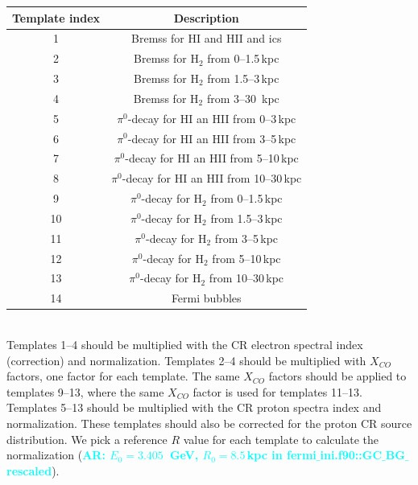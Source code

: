 \documentclass{article}
\newcommand{\ar}[1]{\textcolor{cyan}{{\bf AR: #1}}}
\begin{document}
   \begin{tabular}[h]{c|c}
      Template index & Description \\
      \hline
      1 & Bremss for HI and HII and ics \\
      2 & Bremss for H$_2$ from 0--1.5\,kpc \\
      3 & Bremss for H$_2$ from 1.5--3\,kpc \\
      4 & Bremss for H$_2$ from 3--30 \,kpc \\
      5 & $\pi^0$-decay for HI an HII from 0--3\,kpc \\
      6 & $\pi^0$-decay for HI an HII from 3--5\,kpc \\
      7 & $\pi^0$-decay for HI an HII from 5--10\,kpc \\
      8 & $\pi^0$-decay for HI an HII from 10--30\,kpc \\
      9 & $\pi^0$-decay for H$_2$ from 0--1.5\,kpc \\
     10 & $\pi^0$-decay for H$_2$ from 1.5--3\,kpc \\
     11 & $\pi^0$-decay for H$_2$ from 3--5\,kpc \\
     12 & $\pi^0$-decay for H$_2$ from 5--10\,kpc \\
     13 & $\pi^0$-decay for H$_2$ from 10--30\,kpc \\
     14 & Fermi bubbles \\
   \end{tabular}\\

   Templates 1--4 should be multiplied with the CR electron spectral index
   (correction) and normalization.  Templates 2--4 should be multiplied with
   $X_{CO}$ factors, one factor for each template.  The same $X_{CO}$ factors
   should be applied to templates 9--13, where the same $X_{CO}$ factor is
   used for templates 11--13.  Templates 5--13 should be multiplied with the CR proton spectra index and
   normalization.  These templates should also be corrected for the proton CR
   source distribution.  We pick a reference $R$ value for each template to calculate the normalization (\ar{$E_{0} = 3.405$\ GeV, $R_{0} = 8.5$\,kpc in fermi$\_$ini.f90::GC$\_$BG$\_$rescaled}).
\end{document}
